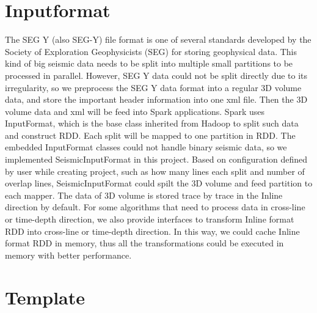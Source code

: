 \section{Inputformat}

The SEG Y (also SEG-Y) \cite{} file format is one of several standards developed by the Society of Exploration Geophysicists (SEG) for storing geophysical data. This kind of big seismic data needs to be split into multiple small partitions to be processed in parallel. However, SEG Y data could not be split directly due to its irregularity, so we preprocess the SEG Y data format into a regular 3D volume data, and store the important header information into one xml file. Then the 3D volume data and xml will be feed into Spark applications. Spark uses InputFormat, which is the base class inherited from Hadoop to split such data and construct RDD. Each split will be mapped to one partition in RDD. The embedded InputFormat classes could not handle binary seismic data, so we implemented SeismicInputFormat in this project.  Based on configuration defined by user while creating project, such as how many lines each split and number of overlap lines, SeismicInputFormat could spilt the 3D volume and feed partition to each mapper. The data of 3D volume is stored trace by trace in the Inline direction by default. For some algorithms that need to process data in cross-line or time-depth direction, we also provide interfaces to transform Inline format RDD into cross-line or time-depth direction. In this way, we could cache Inline format RDD in memory, thus all the transformations could be executed in memory with better performance.



\section{Template}

